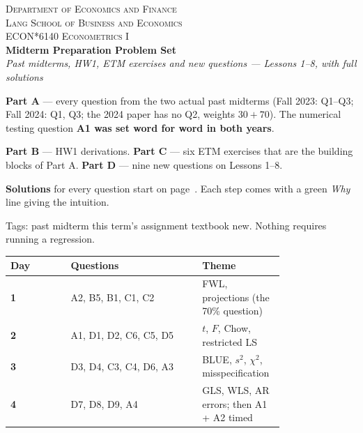 \documentclass[11pt]{article}
\newcommand{\examtag}[1]{\tcbox[on line, colback=examred, colframe=examred, coltext=white,
  boxsep=1pt, left=3pt, right=3pt, top=0pt, bottom=0pt, arc=1.5pt]{\scriptsize\sffamily\bfseries EXAM #1}}
\newcommand{\hwtag}[1]{\tcbox[on line, colback=hwblue, colframe=hwblue, coltext=white,
  boxsep=1pt, left=3pt, right=3pt, top=0pt, bottom=0pt, arc=1.5pt]{\scriptsize\sffamily\bfseries HW1 #1}}
\newcommand{\etmtag}[1]{\tcbox[on line, colback=gray!60, colframe=gray!60, coltext=white,
  boxsep=1pt, left=3pt, right=3pt, top=0pt, bottom=0pt, arc=1.5pt]{\scriptsize\sffamily\bfseries ETM #1}}
\newcommand{\newtag}{\tcbox[on line, colback=qnavy!60, colframe=qnavy!60, coltext=white,
  boxsep=1pt, left=3pt, right=3pt, top=0pt, bottom=0pt, arc=1.5pt]{\scriptsize\sffamily\bfseries NEW}}
\begin{document}
\begin{center}
  {\footnotesize\scshape Department of Economics and Finance\\
   Lang School of Business and Economics}\\[5pt]
  {\large\scshape ECON*6140 Econometrics I}\\[3pt]
  {\LARGE\bfseries\color{qnavy} Midterm Preparation Problem Set}\\[4pt]
  {\itshape Past midterms, HW1, ETM exercises and new questions --- Lessons 1--8,
  with full solutions}
\end{center}
\vspace{0.9em}

\begin{flatlist}
  \item \textbf{Part A} --- every question from the two actual past midterms
        (Fall 2023: Q1--Q3; Fall 2024: Q1, Q3; the 2024 paper has no Q2, weights $30+70$).
        The numerical testing question \textbf{A1 was set word for word in both years}.
  \item \textbf{Part B} --- HW1 derivations. \textbf{Part C} --- six ETM exercises that are
        the building blocks of Part A. \textbf{Part D} --- nine new questions on Lessons 1--8.
  \item \textbf{Solutions} for every question start on page~\pageref{sec:solutions}.
        Each step comes with a green \emph{Why} line giving the intuition.
  \item Tags: \examtag{} past midterm \quad \hwtag{} this term's assignment
        \quad \etmtag{} textbook \quad \newtag{} new.
        Nothing requires running a regression.
\end{flatlist}

\begin{center}
\renewcommand{\arraystretch}{1.25}
\begin{tabular}{>{\bfseries}l p{0.48\linewidth} p{0.3\linewidth}}
  \toprule
  Day & Questions & Theme \\
  \midrule
  1 & A2, B5, B1, C1, C2 & FWL, projections (the 70\% question) \\
  2 & A1, D1, D2, C6, C5, D5 & $t$, $F$, Chow, restricted LS \\
  3 & D3, D4, C3, C4, D6, A3 & BLUE, $s^{2}$, $\chi^{2}$, misspecification \\
  4 & D7, D8, D9, A4 & GLS, WLS, AR errors; then A1 + A2 timed \\
  \bottomrule
\end{tabular}
\end{center}
\end{document}
